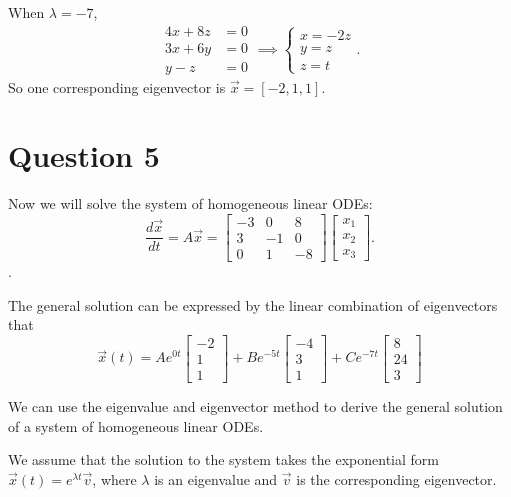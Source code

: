 \documentclass[12pt,a4paper]{article}
\begin{document}
\begin{solution}
When $\lambda = -7$,
\[
\begin{aligned}
4x + 8z &= 0 \\
3x + 6y &= 0 \\
y - z &= 0
\end{aligned}
\implies
\begin{cases}
    x = -2 z\\
    y = z\\
    z = t
\end{cases}.
\]
So one corresponding eigenvector is $\Vec{x}=\left[-2, 1, 1\right]$.
\end{solution}

\section*{Question 5}
\begin{solution}
Now we will solve the system of homogeneous linear ODEs:
\[
\frac{d \Vec{x}}{d t}=A \Vec{x} = 
\left[\begin{array}{ccc}
-3 & 0 & 8 \\
3 & -1 & 0 \\
0 & 1 & -8
\end{array}\right] 
\begin{bmatrix}
    x_1\\x_2\\x_3
\end{bmatrix}.
\].

The general solution can be expressed by the linear combination of eigenvectors that
\[
\vec{x}(t)=
A e^{0t} \begin{bmatrix}-2\\1\\1\end{bmatrix}
+B e^{-5t}\begin{bmatrix}-4\\3\\1\end{bmatrix}
+C e^{-7t}\begin{bmatrix}8\\ 24\\ 3\end{bmatrix}
\]

\begin{remark}
We can use the eigenvalue and eigenvector method to derive the general solution of a system of homogeneous linear ODEs.

We assume that the solution to the system takes the exponential form $\Vec{x}(t) = e^{\lambda t} \Vec{v}$, where $\lambda$ is an eigenvalue and $\Vec{v}$ is the corresponding eigenvector.


\end{remark}
\end{solution}
\end{document}
